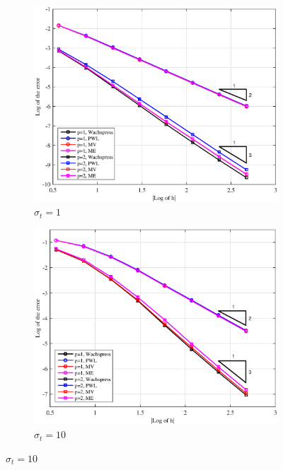 \begin{figure}
\centering
{
	\begin{subfigure}[b]{0.485\textwidth}
		\centering
		\label{subfig::PA_LeftTop_SplitPoly_sig1}
		\includegraphics[width=\textwidth]{figures/sec_BF/PAErr_LeftTop_SplitPoly_sig1.eps}
	\caption{$\sigma_t = 1$}
	\end{subfigure}
	\hfill
	\begin{subfigure}[b]{0.485\textwidth}
		\centering
		\label{subfig::PA_LeftTop_SplitPoly_sig10}
		\includegraphics[width=\textwidth]{figures/sec_BF/PAErr_LeftTop_SplitPoly_sig10.eps}
	\caption{$\sigma_t = 10$}

\end{subfigure}}
\end{figure}
